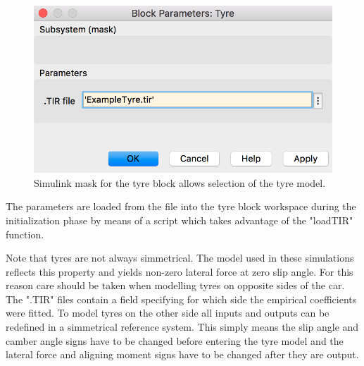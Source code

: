 \begin{figure}[ht]
    \centering
    \includegraphics[scale=0.5]{images/tyremask.png}
    \caption{Simulink mask for the tyre block allows selection of the tyre model.}
    \label{tyremask}
\end{figure}

The parameters are loaded from the file into the tyre block workspace during the initialization phase by means of a script which takes advantage of the "loadTIR" function\cite{loadtir}.

Note that tyres are not always simmetrical. The model used in these simulations reflects this property and yields non-zero lateral force at zero slip angle. For this reason care should be taken when modelling tyres on opposite sides of the car. The ".TIR" files contain a field specifying for which side the empirical coefficients were fitted. To model tyres on the other side all inputs and outputs can be redefined in a simmetrical reference system. This simply means the slip angle and camber angle signs have to be changed before entering the tyre model and the lateral force and aligning moment signs have to be changed after they are output.

